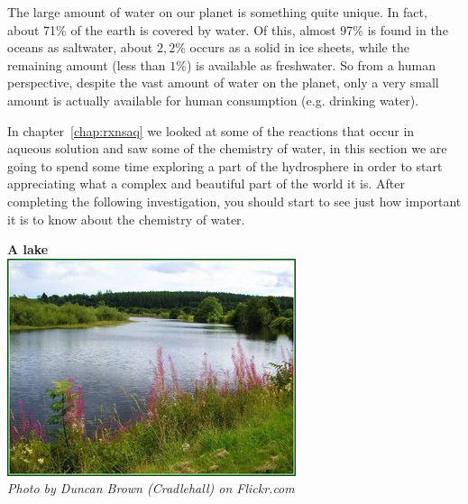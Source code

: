 The large amount of water on our planet is something quite unique. In fact, about 71\% of the earth is covered by water. Of this, almost 97\% is found in the oceans as saltwater, about $2,2\%$ occurs as a solid in ice sheets, while the remaining amount (less than $1\%$) is available as freshwater. So from a human perspective, despite the vast amount of water on the planet, only a very small amount is actually available for human consumption (e.g.\@{} drinking water).\\ \vspace{.2cm}
\begin{minipage}{.5\textwidth}
In chapter~\ref{chap:rxnsaq} we looked at some of the reactions that occur in aqueous solution and saw some of the chemistry of water, in this section we are going to spend some time exploring a part of the hydrosphere in order to start appreciating what a complex and beautiful part of the world it is. After completing the following investigation, you should start to see just how important it is to know about the chemistry of water.
\end{minipage}
\begin{minipage}{.5\textwidth}
\begin{center}
\textbf{A lake}\\
 \includegraphics[width=.7\textwidth]{photos/DuncanBrown(Cradlehall).jpg} \\
\textsl{Photo by Duncan Brown (Cradlehall) on Flickr.com}
\end{center}
\end{minipage}
\vspace{-1cm}
